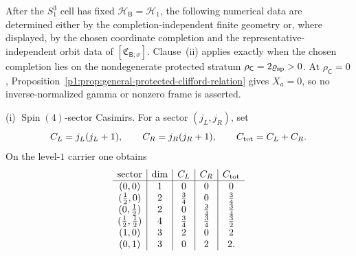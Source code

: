 \documentclass[11pt]{article}
\begin{document}
\begin{theorem}[\(m=1\) finite numerical data]
\label{p1:thm:s3one-numerical-data}
After the \(S^3_1\) cell has fixed \(\mathcal H_{\mathsf B}=\mathcal H_1\), the
following numerical data are determined either by the completion-independent
finite geometry or, where displayed, by the chosen coordinate completion and
the representative-independent orbit data of
\([\mathfrak C_{\mathsf B;\sigma}]\).  Clause~\textup{(ii)} applies exactly
when the chosen completion lies on the nondegenerate protected stratum
\(\rho_{\mathsf C}=2\varrho_{\rm sp}>0\).  At
\(\rho_{\mathsf C}=0\), Proposition~\ref{p1:prop:general-protected-clifford-relation}
gives \(X_a=0\), so no inverse-normalized gamma or nonzero frame is asserted.

\smallskip
\noindent\textup{(i) \(\operatorname{Spin}(4)\)-sector Casimirs.}
For a sector \((j_L,j_R)\), set
\[
    C_L=j_L(j_L+1),\qquad
    C_R=j_R(j_R+1),\qquad
    C_{\rm tot}=C_L+C_R.
\]
On the level-\(1\) carrier one obtains
\[
\begin{array}{c|c|c|c|c}
\text{sector} & \dim & C_L & C_R & C_{\rm tot}\\
\hline
(0,0) & 1 & 0 & 0 & 0\\
(\tfrac12,0) & 2 & \tfrac34 & 0 & \tfrac34\\
(0,\tfrac12) & 2 & 0 & \tfrac34 & \tfrac34\\
(\tfrac12,\tfrac12) & 4 & \tfrac34 & \tfrac34 & \tfrac32\\
(1,0) & 3 & 2 & 0 & 2\\
(0,1) & 3 & 0 & 2 & 2.
\end{array}
\]


\end{theorem}
\end{document}
